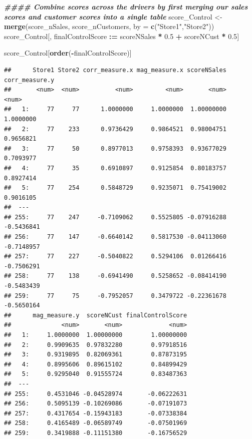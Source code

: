 \documentclass[
]{article}
\newenvironment{Shaded}{\begin{snugshade}}{\end{snugshade}}
\newcommand{\AttributeTok}[1]{\textcolor[rgb]{0.13,0.29,0.53}{#1}}
\newcommand{\DocumentationTok}[1]{\textcolor[rgb]{0.56,0.35,0.01}{\textbf{\textit{#1}}}}
\newcommand{\FloatTok}[1]{\textcolor[rgb]{0.00,0.00,0.81}{#1}}
\newcommand{\FunctionTok}[1]{\textcolor[rgb]{0.13,0.29,0.53}{\textbf{#1}}}
\newcommand{\NormalTok}[1]{#1}
\newcommand{\OtherTok}[1]{\textcolor[rgb]{0.56,0.35,0.01}{#1}}
\newcommand{\SpecialCharTok}[1]{\textcolor[rgb]{0.81,0.36,0.00}{\textbf{#1}}}
\newcommand{\StringTok}[1]{\textcolor[rgb]{0.31,0.60,0.02}{#1}}
\begin{document}
\begin{Shaded}
\begin{Highlighting}[]
\DocumentationTok{\#\#\#\# Combine scores across the drivers by first merging our sales scores and customer scores into a single table}
\NormalTok{score\_Control }\OtherTok{\textless{}{-}} \FunctionTok{merge}\NormalTok{(score\_nSales, score\_nCustomers, }\AttributeTok{by =} \FunctionTok{c}\NormalTok{(}\StringTok{"Store1"}\NormalTok{,}\StringTok{"Store2"}\NormalTok{))}
\NormalTok{score\_Control[, finalControlScore }\SpecialCharTok{:=}\NormalTok{ scoreNSales }\SpecialCharTok{*} \FloatTok{0.5} \SpecialCharTok{+}\NormalTok{ scoreNCust }\SpecialCharTok{*} \FloatTok{0.5}\NormalTok{]}
\end{Highlighting}
\end{Shaded}

\begin{Shaded}
\begin{Highlighting}[]
\NormalTok{score\_Control[}\FunctionTok{order}\NormalTok{(}\SpecialCharTok{{-}}\NormalTok{finalControlScore)]}
\end{Highlighting}
\end{Shaded}

\begin{verbatim}
##      Store1 Store2 corr_measure.x mag_measure.x scoreNSales corr_measure.y
##       <num>  <num>          <num>         <num>       <num>          <num>
##   1:     77     77      1.0000000     1.0000000  1.00000000      1.0000000
##   2:     77    233      0.9736429     0.9864521  0.98004751      0.9656821
##   3:     77     50      0.8977013     0.9758393  0.93677029      0.7093977
##   4:     77     35      0.6910897     0.9125854  0.80183757      0.8927414
##   5:     77    254      0.5848729     0.9235071  0.75419002      0.9016105
##  ---                                                                      
## 255:     77    247     -0.7109062     0.5525805 -0.07916288     -0.5436841
## 256:     77    147     -0.6640142     0.5817530 -0.04113060     -0.7148957
## 257:     77    227     -0.5040822     0.5294106  0.01266416     -0.7506291
## 258:     77    138     -0.6941490     0.5258652 -0.08414190     -0.5483439
## 259:     77     75     -0.7952057     0.3479722 -0.22361678     -0.5650164
##      mag_measure.y  scoreNCust finalControlScore
##              <num>       <num>             <num>
##   1:     1.0000000  1.00000000        1.00000000
##   2:     0.9909635  0.97832280        0.97918516
##   3:     0.9319895  0.82069361        0.87873195
##   4:     0.8995606  0.89615102        0.84899429
##   5:     0.9295040  0.91555724        0.83487363
##  ---                                            
## 255:     0.4531046 -0.04528974       -0.06222631
## 256:     0.5095139 -0.10269086       -0.07191073
## 257:     0.4317654 -0.15943183       -0.07338384
## 258:     0.4165489 -0.06589749       -0.07501969
## 259:     0.3419888 -0.11151380       -0.16756529
\end{verbatim}
\end{document}
